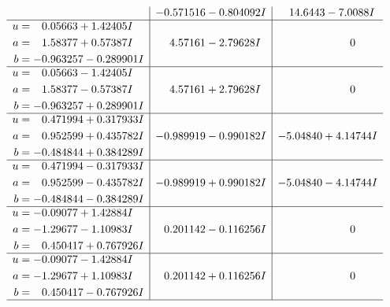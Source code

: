 \documentclass[1p]{elsarticle_modified}
\theoremstyle{definition}
\begin{document}
$$\begin{array}{c|c|c}
 & -0.571516 - 0.804092 I & \phantom{-}14.6443 - 7.0088 I \\ \hline\begin{aligned}
u &= \phantom{-}0.05663 + 1.42405 I \\
a &= \phantom{-}1.58377 + 0.57387 I \\
b &= -0.963257 - 0.289901 I\end{aligned}
 & \phantom{-}4.57161 - 2.79628 I & \phantom{-0.000000 } 0 \\ \hline\begin{aligned}
u &= \phantom{-}0.05663 - 1.42405 I \\
a &= \phantom{-}1.58377 - 0.57387 I \\
b &= -0.963257 + 0.289901 I\end{aligned}
 & \phantom{-}4.57161 + 2.79628 I & \phantom{-0.000000 } 0 \\ \hline\begin{aligned}
u &= \phantom{-}0.471994 + 0.317933 I \\
a &= \phantom{-}0.952599 + 0.435782 I \\
b &= -0.484844 + 0.384289 I\end{aligned}
 & -0.989919 - 0.990182 I & -5.04840 + 4.14744 I \\ \hline\begin{aligned}
u &= \phantom{-}0.471994 - 0.317933 I \\
a &= \phantom{-}0.952599 - 0.435782 I \\
b &= -0.484844 - 0.384289 I\end{aligned}
 & -0.989919 + 0.990182 I & -5.04840 - 4.14744 I \\ \hline\begin{aligned}
u &= -0.09077 + 1.42884 I \\
a &= -1.29677 - 1.10983 I \\
b &= \phantom{-}0.450417 + 0.767926 I\end{aligned}
 & \phantom{-}0.201142 - 0.116256 I & \phantom{-0.000000 } 0 \\ \hline\begin{aligned}
u &= -0.09077 - 1.42884 I \\
a &= -1.29677 + 1.10983 I \\
b &= \phantom{-}0.450417 - 0.767926 I\end{aligned}
 & \phantom{-}0.201142 + 0.116256 I & \phantom{-0.000000 } 0\\
 \hline 
 \end{array}$$\newpage$$\begin{array}{c|c|c}  

\end{array}$$
\end{document}
